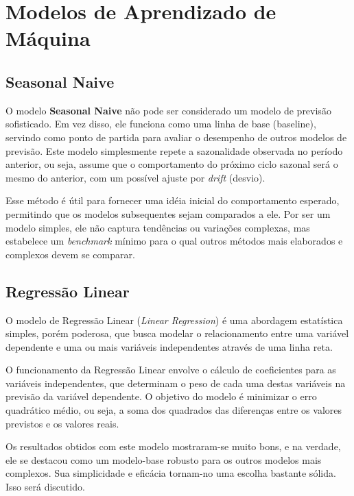 \section{Modelos de Aprendizado de Máquina}

\subsection{Seasonal Naive}

O modelo \textbf{Seasonal Naive} não pode ser considerado um modelo de previsão sofisticado. Em vez disso, ele funciona como uma linha de base (baseline), servindo como ponto de partida para avaliar o desempenho de outros modelos de previsão. Este modelo simplesmente repete a sazonalidade observada no período anterior, ou seja, assume que o comportamento do próximo ciclo sazonal será o mesmo do anterior, com um possível ajuste por \textit{drift} (desvio).

Esse método é útil para fornecer uma idéia inicial do comportamento esperado, permitindo que os modelos subsequentes sejam comparados a ele. Por ser um modelo simples, ele não captura tendências ou variações complexas, mas estabelece um \textit{benchmark} mínimo para o qual outros métodos mais elaborados e complexos devem se comparar.

\subsection{Regressão Linear}

O modelo de Regressão Linear (\textit{Linear Regression}) é uma abordagem estatística simples, porém poderosa, que busca modelar o relacionamento entre uma variável dependente e uma ou mais variáveis independentes através de uma linha reta. 

O funcionamento da Regressão Linear envolve o cálculo de coeficientes para as variáveis independentes, que determinam o peso de cada uma destas variáveis na previsão da variável dependente. O objetivo do modelo é minimizar o erro quadrático médio, ou seja, a soma dos quadrados das diferenças entre os valores previstos e os valores reais.

Os resultados obtidos com este modelo mostraram-se muito bons, e na verdade, ele se destacou como um modelo-base robusto para os outros modelos mais complexos. Sua simplicidade e eficácia tornam-no uma escolha bastante sólida. Isso será discutido.

